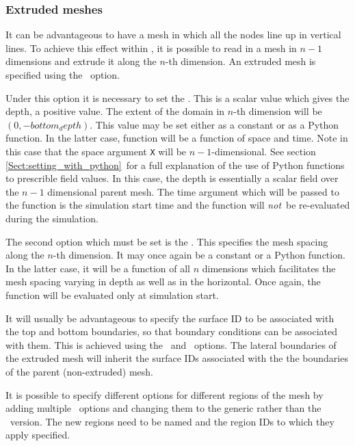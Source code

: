 \subsubsection{Extruded meshes}\label{Sect:extruded}

It can be advantageous to have a mesh in which all the nodes line up in
vertical lines. To achieve this effect within \fluidity, it is possible to
read in a mesh in $n-1$ dimensions and extrude it along the $n$-th
dimension. An extruded mesh is specified using the
\ option. 

Under this option it is necessary to set the . This is
a scalar value which gives the depth, a positive value. The extent of the
domain in $n$-th dimension will be $(0,-bottom_depth)$. This value may be
set either as a constant or as a Python function. In the latter case,
function will be a function of space and time. Note in this case that the
space argument \lstinline[language=Python]+X+ will be $n-1$-dimensional. See
section \ref{Sect:setting_with_python}\ for a full explanation of the use of Python functions to
prescrible field values. In this case, the depth is essentially a scalar
field over the $n-1$ dimensional parent mesh. The time argument which
will be passed to the function is the simulation start time and the function
will \emph{not}\ be re-evaluated during the simulation.

The second option which must be set is the
. This specifies the mesh spacing
along the $n$-th dimension. It may once again be a constant or a Python
function. In the latter case, it will be a function of all $n$ dimensions
which facilitates the mesh spacing varying in depth as well as in the
horizontal. Once again, the function will be evaluated only at simulation
start. 

It will usually be advantageous to specify the surface ID to be associated
with the top and bottom boundaries, so that boundary conditions can be
associated with them. This is achieved using the
\ and
\ options. The lateral boundaries
of the extruded mesh will inherit the surface IDs associated with the the
boundaries of the parent (non-extruded) mesh.

It is possible to specify different options for different regions of the
mesh by adding multiple \ options and changing
them to the generic rather than the \
version. The new regions need to be named and the region IDs to which they
apply specified.

